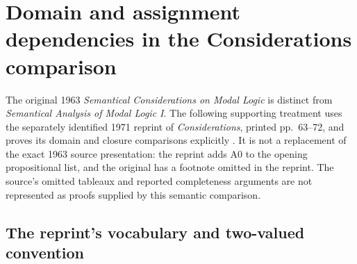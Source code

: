 \section{Domain and assignment dependencies in the Considerations comparison}
\label{sec:p08-n-b-009-02}

The original 1963 \emph{Semantical Considerations on Modal Logic} is
distinct from \emph{Semantical Analysis of Modal Logic I}. The following
supporting treatment uses the separately identified 1971 reprint of
\emph{Considerations}, printed pp.~63--72, and proves its domain and
closure comparisons explicitly \cite{Kripke1971ConsiderationsReprint}.
It is not a replacement of the exact 1963 source presentation: the
reprint adds A0 to the opening propositional list, and the original has
a footnote omitted in the reprint. The source's omitted tableaux and
reported completeness arguments are not represented as proofs supplied
by this semantic comparison.

\subsection{The reprint's vocabulary and two-valued convention}

